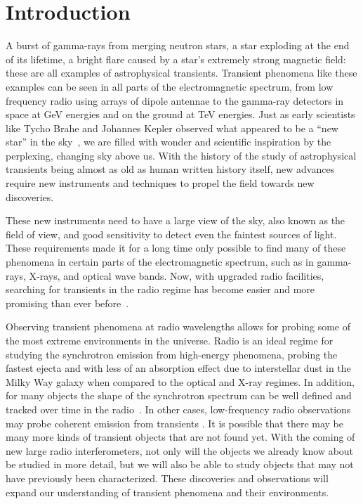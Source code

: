 \documentclass[12pt]{article}
\begin{document}
 
   
         
       
 \doublespacing
\setcounter{page}{1}
	\section{Introduction}
\label{introlabel}

A burst of gamma-rays from merging neutron stars, a star exploding at the end of its lifetime, a bright flare caused by a star's extremely strong magnetic field: these are all examples of astrophysical transients. Transient phenomena like these examples can be seen in all parts of the electromagnetic spectrum, from low frequency radio using arrays of dipole antennae to the gamma-ray detectors in space at GeV energies and on the ground at TeV energies. Just as early scientists like Tycho Brahe and Johannes Kepler observed what appeared to be a ``new star'' in the sky~\citep{1969dnen.book.....B,1606dsnip.book.....K}, we are filled with wonder and scientific inspiration by the perplexing, changing sky above us. With the history of the study of astrophysical transients being almost as old as human written history itself, new advances require new instruments and techniques to propel the field towards new discoveries. 

These new instruments need to have a large view of the sky, also known as the field of view, and good sensitivity to detect even the faintest sources of light. These requirements made it for a long time only possible to find many of these phenomena in certain parts of the electromagnetic spectrum, such as in gamma-rays, X-rays, and optical wave bands. Now, with upgraded radio facilities, searching for transients in the radio regime has become easier and more promising than ever before~\citep{2011BASI...39..315F}.

Observing transient phenomena at radio wavelengths allows for probing some of the most extreme environments in the universe. Radio is an ideal regime for studying the synchrotron emission from high-energy phenomena, probing the fastest ejecta and with less of an absorption effect due to interstellar dust in the Milky Way galaxy when compared to the optical and X-ray regimes. In addition, for many objects the shape of the synchrotron spectrum can be well defined and tracked over time in the radio~\citep[e.g.,][]{2014PASA...31....8G}. In other cases, low-frequency radio observations may probe coherent emission from transients \citep[e.g.,][]{2015MNRAS.446.3687P}. It is possible that there may be many more kinds of transient objects that are not found yet. With the coming of new large radio interferometers, not only will the objects we already know about be studied in more detail, but we will also be able to study objects that may not have previously been characterized. These discoveries and observations will expand our understanding of transient phenomena and their environments.
\end{document}
